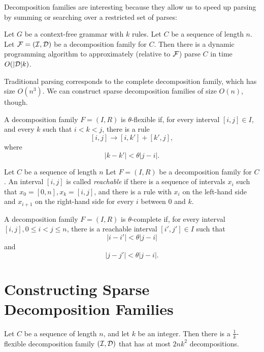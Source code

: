 \documentclass{article}
\begin{document}
Decomposition families are interesting because they allow us to speed
up parsing by summing or searching over a restricted set of parses:
\begin{thm}
  Let $G$ be a context-free grammar with $k$ rules. Let $C$ be a
  sequence of length $n$. Let ${\mathcal F}=({\mathcal I},{\mathcal D})$ be a decomposition
  family for $C$. Then there is a dynamic programming algorithm to
  approximately (relative to ${\mathcal F}$) parse $C$ in time $O(|{\mathcal D}|k)$.
\end{thm}
Traditional parsing corresponds to the complete decomposition family,
which has size $O(n^3)$. We can construct sparse decomposition
families of size $O(n)$, though.

\begin{defn}
A decomposition family $F=(I,R)$ is $\theta$-flexible if, for every interval
$[i,j]\in I$, and every $k$ such that $i<k<j$, there is a rule
$$[i,j] \to [i,k'] + [k',j],$$
where 
$$|k-k'| < \theta |j-i|.$$
\end{defn}

\begin{defn}
Let $C$ be a sequence of length $n$ Let $F=(I,R)$ be a decomposition
family for $C$.  An interval $[i,j]$ is called {\em reachable} if
there is a sequence of intervals $x_i$ such that $x_0=[0,n],
x_k=[i,j]$, and there is a rule with $x_i$ on the left-hand side and
$x_{i+1}$ on the right-hand side for every $i$ between $0$ and $k$.
\end{defn}

\begin{defn}
A decomposition family $F=(I,R)$ is $\theta$-complete if, for every
interval $[i,j], 0\le i< j \le n$, there is a reachable interval
$[i',j']\in I$ such that
$$|i-i'| < \theta |j-i|$$
and
$$|j-j'| < \theta |j-i|.$$
\end{defn}

\section{Constructing Sparse Decomposition Families}

\begin{thm}
  Let $C$ be a sequence of length $n$, and let $k$ be an integer. Then
  there is a $\frac{1}{k}$-flexible decomposition family $({\mathcal I},{\mathcal D})$
  that has at most $2nk^2$ decompositions.
\end{thm}
\end{document}
